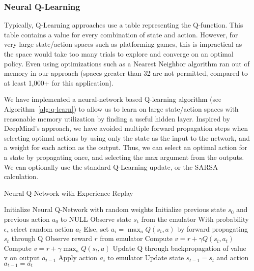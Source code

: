 \documentclass{article}
\begin{document}
\subsubsection{Neural Q-Learning}

Typically, Q-Learning approaches use a table representing the Q-function. This table contains a value for every combination of state and action. However, for very large state/action spaces such as platforming games, this is impractical as the space would take too many trials to explore and converge on an optimal policy. Even using optimizations such as a Nearest Neighbor algorithm ran out of memory in our approach (spaces greater than 32 are not permitted, compared to at least 1,000+ for this application). 

We have implemented a neural-network based Q-learning algorithm (see Algorithm~\ref{alg:q-learn}) to allow us to learn on large state/action spaces with reasonable memory utilization by finding a useful hidden layer. Inspired by DeepMind's approach, we have avoided multiple forward propagation steps when selecting optimal actions by using only the state as the input to the network, and a weight for each action as the output. Thus, we can select an optimal action for a state by propagating once, and selecting the max argument from the outputs. We can optionally use the standard Q-Learning update, or the SARSA calculation.

\begin{algorithm}[tb]
   \caption{Neural Q-Network with Experience Replay}
   \label{alg:q-learn}
\begin{algorithmic}
   \STATE Initialize Neural Q-Network with random weights
   \STATE Initialize previous state $s_0$ and previous action $a_0$ to NULL
   \STATE Observe state $s_t$ from the emulator
   \STATE With probability $\epsilon$, select random action $a_t$
   \STATE Else, set $a_i = \max_a Q(s_t, a)$ by forward propagating $s_t$ through Q
   \STATE Observe reward $r$ from emulator
   \STATE Compute $v = r + \gamma Q(s_t, a_t)$
   \ELSE
   \STATE Compute $v = r + \gamma \max_a Q(s_t, a)$
   \ENDIF
   \STATE Update Q through backpropagation of value v on output $a_{t-1}$
   \ENDIF
   \STATE Apply action $a_i$ to emulator
   \STATE Update state $s_{t-1} = s_t$ and action $a_{t-1} = a_t$
   \ENDFOR
   \ENDFOR
\end{algorithmic}
\end{algorithm}
\end{document}
